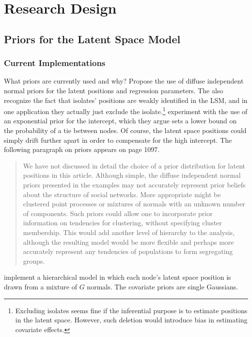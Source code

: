 \documentclass[12pt]{article}
\begin{document}
\section{Research Design}

\subsection{Priors for the Latent Space Model}

\subsubsection{Current Implementations}

What priors are currently used and why? \cite{hoff2002latent} Propose the use of diffuse independent normal priors for the latent positions and regression parameters. The also recognize the fact that isolates' positions are weakly identified in the LSM, and in one application they actually just exclude the isolate.\footnote{Excluding isolates seems fine if the inferential purpose is to estimate positions in the latent space. However, such deletion would introduce bias in estimating covariate effects.} \cite{hoff2002latent} experiment with the use of an exponential prior for the intercept, which they argue sets a lower bound on the probability of a tie between nodes. Of course, the latent space positions could simply drift further apart in order to compensate for the high intercept. The following paragraph on priors appears on page 1097.

\begin{quote}
We have not discussed in detail the choice of a prior distribution for latent positions in this article. Although simple, the diffuse independent normal priors presented in the examples may not accurately represent prior beliefs about the structure of social networks. More appropriate might be clustered point processes or mixtures of normals with an unknown number of components. Such priors could allow one to incorporate prior information on tendencies for clustering, without specifying cluster membership. This would add another level of hierarchy to the analysis, although the resulting model would be more flexible and perhaps more accurately represent any tendencies of populations to form segregating groups.
\end{quote}

\citep{Krivitsky2009} implement a hierarchical model in which each node's latent space position is drawn from a mixture of $G$ normals. The covariate priors are single Gaussians.
\end{document}
